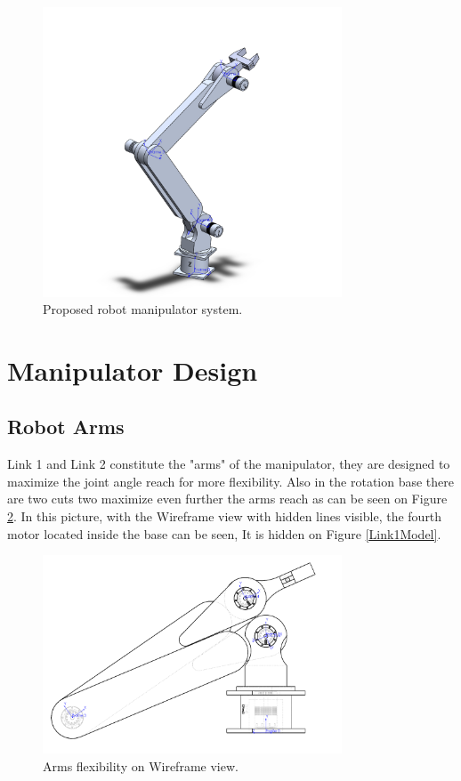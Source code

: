 \documentclass[transmag]{IEEEtran}
\begin{document}
\begin{figure}
\centerline{\includegraphics[width=3.5in]{./images/Model}}
\caption{Proposed robot manipulator system.\label{Model}}
\end{figure}








\section{Manipulator Design}


\subsection{Robot Arms}
Link 1 and Link 2 constitute the "arms" of the manipulator, they are designed to maximize the joint angle reach for more flexibility. Also in the rotation base there are two cuts two maximize even further the arms reach as can be seen on Figure \ref{Arms}. In this picture, with the Wireframe view with hidden lines visible, the fourth motor located inside the base can be seen, It is hidden on Figure \ref{Link1Model}.


\begin{figure}
\centerline{\includegraphics[width=3.5in]{./images/Arms}}
\caption{Arms flexibility on Wireframe view.\label{Arms}}
\end{figure}
\end{document}
